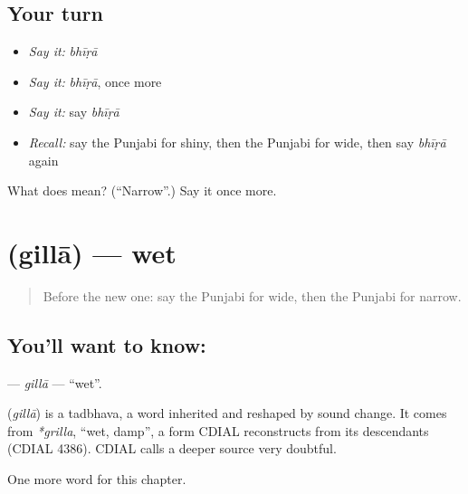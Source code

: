 \subsection*{Your turn}
\begin{itemize}
\raggedright
  \item \emph{Say it:} \emph{bhīṛā}
  \item \emph{Say it:} \emph{bhīṛā}, once more
  \item \emph{Say it:} say \emph{bhīṛā}
  \item \emph{Recall:} say the Punjabi for shiny, then the Punjabi for wide, then say \emph{bhīṛā} again
\end{itemize}

\begin{tcolorbox}[breakable,colback=teal!4,colframe=teal!35!black,title={Before you move on}]
What does  mean? (\textquotedblleft{}Narrow\textquotedblright{}.) Say it once more.
\end{tcolorbox}
\section[\texorpdfstring{\pa{ਗਿੱਲਾ} (gillā)}{ਗਿੱਲਾ (gillā)}]{ (gillā) — wet}

\label{lesson:PA-C142-gilla}



\begin{quote}
Before the new one: say the Punjabi for wide, then the Punjabi for narrow.
\end{quote}

\subsection*{You'll want to know: }
\textbf{} — \emph{gillā} — \textquotedblleft{}wet\textquotedblright{}.

\begin{cousinweb}
\textbf{} (\emph{gillā}) is a tadbhava, a word inherited and reshaped by sound change. It comes from \emph{*grilla}, \textquotedblleft{}wet, damp\textquotedblright{}, a form CDIAL reconstructs from its descendants (CDIAL 4386). CDIAL calls a deeper source very doubtful.
\end{cousinweb}

\begin{grammarlens}[title={What you've built}]
One more word for this chapter.
\end{grammarlens}


